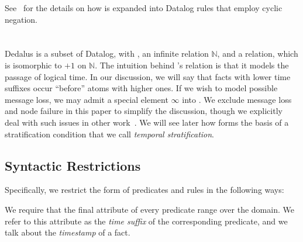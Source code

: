 See~\cite{sacca-zaniolo} for the details on how  is expanded
into Datalog rules that employ cyclic negation.  

\section{\lang}

Dedalus is a subset of Datalog, with , an infinite
 relation $\mathbb{N}$, and a 
relation, which is isomorphic to $+1$ on $\mathbb{N}$.  The intuition behind
\lang's  relation is that it models the passage of logical
time.  In our discussion, we will say that facts with lower time suffixes occur
``before'' atoms with higher ones.  If we wish to model possible message loss,
we may admit a special element $\infty$ 
into .  We exclude message loss and node failure in this paper to
simplify the discussion, though we explicitly deal with such issues in other
work~\cite{dedalus-techr, netdb}. 
We will see later how  forms the basis of a stratification
condition that we call {\em temporal stratification}.

\subsection{Syntactic Restrictions}
\label{sec:syntaxrestrictions}

Specifically, we restrict the form of predicates and rules in the following ways:

We require that the final attribute of every \lang
predicate range over the  domain.  
We refer to this attribute as the \emph{time suffix} of the corresponding
predicate, and we talk about the {\em timestamp} of a fact. 

